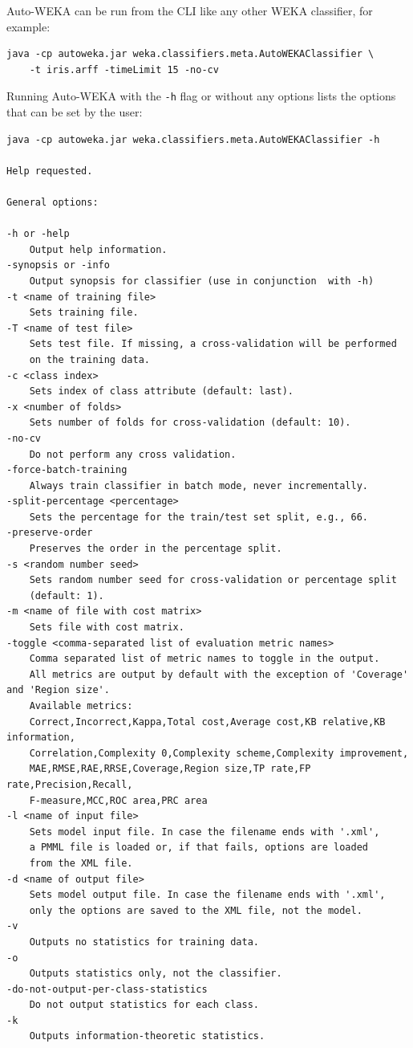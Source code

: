 \documentclass{article}
\begin{document}
Auto-WEKA can be run from the CLI like any other WEKA classifier, for example:
\begin{verbatim}
java -cp autoweka.jar weka.classifiers.meta.AutoWEKAClassifier \
    -t iris.arff -timeLimit 15 -no-cv
\end{verbatim}

Running Auto-WEKA with the \verb=-h= flag or without any options lists the
options that can be set by the user:
\begin{verbatim}
java -cp autoweka.jar weka.classifiers.meta.AutoWEKAClassifier -h

Help requested.

General options:

-h or -help
	Output help information.
-synopsis or -info
	Output synopsis for classifier (use in conjunction  with -h)
-t <name of training file>
	Sets training file.
-T <name of test file>
	Sets test file. If missing, a cross-validation will be performed
	on the training data.
-c <class index>
	Sets index of class attribute (default: last).
-x <number of folds>
	Sets number of folds for cross-validation (default: 10).
-no-cv
	Do not perform any cross validation.
-force-batch-training
	Always train classifier in batch mode, never incrementally.
-split-percentage <percentage>
	Sets the percentage for the train/test set split, e.g., 66.
-preserve-order
	Preserves the order in the percentage split.
-s <random number seed>
	Sets random number seed for cross-validation or percentage split
	(default: 1).
-m <name of file with cost matrix>
	Sets file with cost matrix.
-toggle <comma-separated list of evaluation metric names>
	Comma separated list of metric names to toggle in the output.
	All metrics are output by default with the exception of 'Coverage' and 'Region size'.
	Available metrics:
	Correct,Incorrect,Kappa,Total cost,Average cost,KB relative,KB information,
	Correlation,Complexity 0,Complexity scheme,Complexity improvement,
	MAE,RMSE,RAE,RRSE,Coverage,Region size,TP rate,FP rate,Precision,Recall,
	F-measure,MCC,ROC area,PRC area
-l <name of input file>
	Sets model input file. In case the filename ends with '.xml',
	a PMML file is loaded or, if that fails, options are loaded
	from the XML file.
-d <name of output file>
	Sets model output file. In case the filename ends with '.xml',
	only the options are saved to the XML file, not the model.
-v
	Outputs no statistics for training data.
-o
	Outputs statistics only, not the classifier.
-do-not-output-per-class-statistics
	Do not output statistics for each class.
-k
	Outputs information-theoretic statistics.

\end{verbatim}
\end{document}
